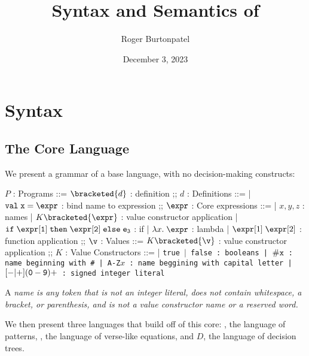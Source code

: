 \documentclass[]{article}
\title{Syntax and Semantics of \VMinus}
\author{Roger Burtonpatel}
\date{December 3, 2023}
\begin{document}
\maketitle

\section{Syntax}

\subsection{The Core Language}

We present a grammar of a base language, with no decision-making constructs: 

\bigskip

\begin{center}
    \begin{bnf}
    $P$ : \textsf{Programs} ::=
    $\bracketed{d}$ : definition
    ;;
    $d$ : \textsf{Definitions} ::=
    | $\tt{val} \; x \; \tt{=} \; \expr$ : bind name to expression
    ;;
    $\expr$ : Core expressions ::= 
    | $x, y, z$ : names
    | $K\bracketed{\expr}$ : value constructor application 
    | $\tt{if} \; \expr[1] \; \tt{then} \; \expr[2] \; \tt{else} \; e_{3} $ : if
    | $\lambda x. \; \expr$ : lambda 
    | $\expr[1] \; \expr[2]$ : function application 
    ;;
    $\v$ : Values ::= $K\bracketed{\v}$ : value constructor application 
    ;;
    $K$ : \textsf{Value Constructors} ::=
    | \tt{true} $\vert$ \tt{false} : booleans
    | $\tt{\#}x$ : name beginning with \tt{\#}
    | \tt{A-Z}$x$ : name beggining with capital letter
    | $[\tt{-}\vert\tt{+}](\tt{0}-\tt{9})+$ : signed integer literal 

    \end{bnf}
\end{center}


A \it{name} is any token that is not an integer literal, 
does not contain whitespace, a bracket, or parenthesis, 
and is not a value constructor name or a reserved word.


We then present three languages that build off of this core: 
\Pplus, the language of patterns, \VMinus, the language of 
verse-like equations, and $D$, the language of decision trees. 
\end{document}
